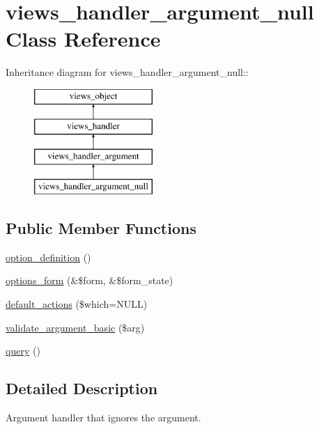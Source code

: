 \hypertarget{classviews__handler__argument__null}{
\section{views\_\-handler\_\-argument\_\-null Class Reference}
\label{classviews__handler__argument__null}
}
Inheritance diagram for views\_\-handler\_\-argument\_\-null::\begin{figure}[H]
\begin{center}
\leavevmode
\includegraphics[height=4cm]{classviews__handler__argument__null}
\end{center}
\end{figure}
\subsection*{Public Member Functions}
\begin{CompactItemize}
\item 
\hyperlink{classviews__handler__argument__null_8ba4c40627657d548ad011a1e203d00f}{option\_\-definition} ()
\item 
\hyperlink{classviews__handler__argument__null_414f383de12d08f6e1e5eccb572cf9c8}{options\_\-form} (\&\$form, \&\$form\_\-state)
\item 
\hyperlink{classviews__handler__argument__null_82da8fd1448e1ce346aa38d5b6021e05}{default\_\-actions} (\$which=NULL)
\item 
\hyperlink{classviews__handler__argument__null_fc4fd62d96247a2ebebbd7e44f0742ce}{validate\_\-argument\_\-basic} (\$arg)
\item 
\hyperlink{classviews__handler__argument__null_887c3f8e9f97a75cc9d91a7b685b5f12}{query} ()
\end{CompactItemize}


\subsection{Detailed Description}
Argument handler that ignores the argument. 

